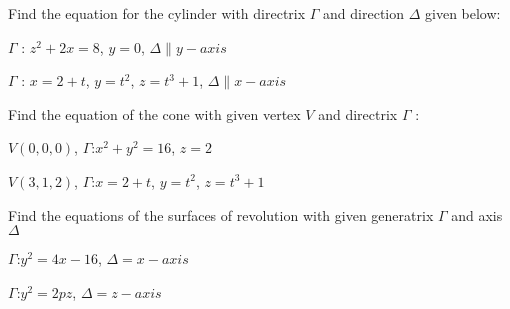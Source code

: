 \documentclass[11pt]{amsbook}
\begin{document}
\begin{hEnumerateArabic}
\begin{hEnumerateAlpha}
            \end{hEnumerateAlpha}
        \item Find the equation for the cylinder with directrix $\Gamma$ and direction $\Delta$ given below:
        	\begin{hEnumerateAlpha}
            	\item $\Gamma$ : $z^2+2x = 8$, $y = 0$, $\Delta \parallel y-axis $  %
                \item $\Gamma$ : $x = 2+t$, $y = t^2$, $z = t^3+1$, $\Delta \parallel x-axis $  
      		\end{hEnumerateAlpha}	
        \item Find the equation of the cone with given vertex $V$ and directrix $\Gamma$ :
        	\begin{hEnumerateAlpha}
            	\item $V(0,0,0)$, $\Gamma$:$x^2+y^2 = 16$, $z = 2$
                \item $V(3,1,2)$, $\Gamma$:$x = 2+t$, $y = t^2$, $z = t^3+1$
      		\end{hEnumerateAlpha}
        \item Find the equations of the surfaces of revolution with given generatrix $\Gamma$ and axis $\Delta$
        	\begin{hEnumerateAlpha}
            	\item $\Gamma$:$y^2 = 4x-16$, $\Delta = x-axis$
                \item $\Gamma$:$y^2 = 2pz$, $\Delta = z-axis$
      		\end{hEnumerateAlpha}
    \end{hEnumerateArabic}






\end{document}
